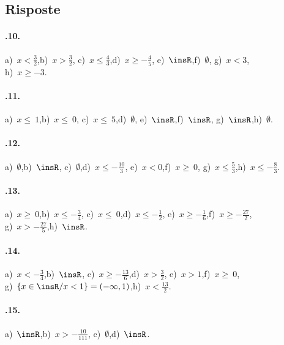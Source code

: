 \subsection{Risposte}
\begin{multicols}{2}
 \paragraph{\thechapter.10.} a)~$x<\frac{3}{2}$,\quad b)~$x>\frac{3}{2}$,\quad
c)~$x\le \frac{4}{3}$,\quad d)~$x\ge -{\frac{4}{5}}$,\quad
e)~$\insR$,\quad f)~$\emptyset $,\quad
g)~$x<3$,\quad \protect\\ h)~$x\ge -3$.

\paragraph{\thechapter.11.} a)~$x\le~1$,\quad b)~$x\le~0$,\quad
c)~$x\le~5$,\quad d)~$\emptyset $,\quad
e)~$\insR$,\quad f)~$\insR$,\quad
g)~$\insR $,\quad h)~$\emptyset $.

\paragraph{\thechapter.12.} a)~$\emptyset $,\quad b)~$\insR$,\quad
c)~$\emptyset $,\quad d)~$x\le -{\frac{10}{3}}$,\quad
e)~$x<0$,\quad f)~$x\ge~0$,\quad
g)~$x\le \frac{5}{3}$,\quad h)~$x\le -{\frac{8}{3}}$.

\paragraph{\thechapter.13.} a)~$x\ge~0$,\quad b)~$x\le -{\frac{3}{4}}$,\quad
c)~$x\le~0$,\quad d)~$x\le -{\frac{1}{2}}$,\quad
e)~$x\ge -{\frac{1}{6}}$,\quad f)~$x\ge -{\frac{27}{2}}$,\quad
\protect\\g)~$x>-{\frac{27}{5}}$,\quad h)~$\insR$.

\paragraph{\thechapter.14.} a)~$x<-{\frac{3}{4}}$,\quad b)~$\insR$,\quad
c)~$x\ge -{\frac{13}{6}}$,\quad d)~$x>\frac{3}{2}$,\quad
e)~$x>1$,\quad f)~$x\ge~0$,\quad\protect\\
g)~$\{x\in\insR/x<1\}=(-\infty,1)$,\quad h)~$x<\frac{13}{2}$.

\paragraph{\thechapter.15.} a)~$\insR$,\quad b)~$x>-{\frac{10}{111}}$,\quad
c)~$\emptyset $,\quad d)~$\insR$.


\end{multicols}
